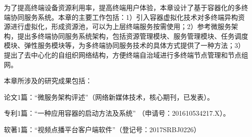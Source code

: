 为了提高终端设备资源利用率，提高终端用户体验，本章设计了基于容器化的多终端协同服务系统。本章的主要工作包括：1）引入容器虚拟化技术对多终端异构资源进行虚拟化，形成资源池，可以为上层终端服务按需使用；2）参考微服务架构，提出多终端协同服务系统架构，包括资源管理模块、服务管理模块、任务调度模块、弹性服务模块等，为多终端协同服务技术的具体方式提供了一种方法；3）提出了去中心化的自组织网络结构，方便终端自治域进行多终端节点管理和节点组网。

本章所涉及的研究成果包括：

论文1篇：“微服务架构评述”（网络新媒体技术，核心期刊，已发表）。

专利1篇：“一种应用容器的启动方法及系统” （申请号：201610534217.X）。

软著1篇：“视频点播平台客户端软件”（登记号：2017SRBJ0226）